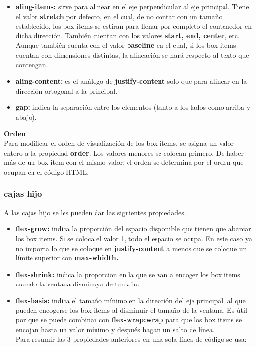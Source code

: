 \documentclass[10pt,oneside]{article}
\begin{document}
\begin{multicols}{2}
\begin{itemize}
        \item \textbf{aling-items:} sirve para alinear en el eje perpendicular al eje principal. Tiene el valor \textbf{stretch} por defecto, en el cual, de no contar con un tamaño establecido, los box items se estiran para llenar por completo el contenedor en dicha dirección. También cuentan con los valores \textbf{start, end, center}, etc. Aunque también cuenta con el valor \textbf{baseline} en el cual, si los box items cuentan con dimensiones distintas, la alineación se hará respecto al texto que contengan. 
        \item \textbf{aling-content:} es el análogo de \textbf{justify-content} solo que para alinear en la dirección ortogonal a la principal.
        \item\textbf{gap:} indica la separación entre los elementos (tanto a los lados como arriba y abajo).
    \end{itemize}

    \textbf{Orden}\\ \newline Para modificar el orden de visualización de los box items, se asigna un valor entero a la propiedad \textbf{order}. Los valores menores se colocan primero. De haber más de un box item con el mismo valor, el orden se determina por el orden que ocupan en el código HTML.

\subsubsection{cajas hijo}

    A las cajas hijo se les pueden dar las siguientes propiedades.
    \begin{itemize}
        \item \textbf{flex-grow: } indica la proporción del espacio disponible que tienen que abarcar los box items. Si se coloca el valor 1, todo el espacio se ocupa. En este caso ya no importa lo que se coloque en \textbf{justify-content} a menos que se coloque un límite superior con \textbf{max-whidth.}
        \item \textbf{flex-shrink:} indica la proporcion en la que se van a encoger los box items cuando la ventana disminuya de tamaño.
        \item \textbf{flex-basis:} indica el tamaño mínimo en la dirección del eje principal, al que pueden encogerse los box items al disminuir el tamaño de la ventana. Es útil por que se puede combinar con \textbf{flex-wrap:wrap} para que los box items se encojan hasta un valor mínimo  y después hagan un salto de línea. \\ \newline Para resumir las 3 propiedades anteriores en una sola línea de código se usa:
        

\end{itemize}
\end{multicols}
\end{document}
